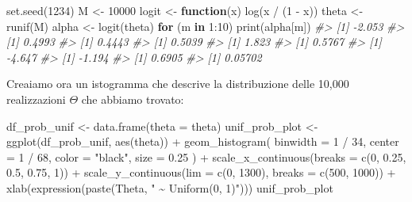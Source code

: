 \documentclass[
  11pt,
]{krantz}
\makeatletter
\newenvironment{Shaded}{\begin{snugshade}}{\end{snugshade}}
\newcommand{\AttributeTok}[1]{\textcolor[rgb]{0.61,0.61,0.61}{#1}}
\newcommand{\CommentTok}[1]{\textcolor[rgb]{0.37,0.37,0.37}{\textit{#1}}}
\newcommand{\ControlFlowTok}[1]{\textcolor[rgb]{0.27,0.27,0.27}{\textbf{#1}}}
\newcommand{\DecValTok}[1]{\textcolor[rgb]{0.06,0.06,0.06}{#1}}
\newcommand{\FloatTok}[1]{\textcolor[rgb]{0.06,0.06,0.06}{#1}}
\newcommand{\FunctionTok}[1]{\textcolor[rgb]{0,0,0}{#1}}
\newcommand{\NormalTok}[1]{#1}
\newcommand{\OtherTok}[1]{\textcolor[rgb]{0.37,0.37,0.37}{#1}}
\newcommand{\SpecialCharTok}[1]{\textcolor[rgb]{0,0,0}{#1}}
\newcommand{\StringTok}[1]{\textcolor[rgb]{0.5,0.5,0.5}{#1}}
\newenvironment{kframe}{%
\medskip{}
\setlength{\fboxsep}{.8em}
 \def\at@end@of@kframe{}%
 \ifinner\ifhmode%
  \def\at@end@of@kframe{\end{minipage}}%
  \begin{minipage}{\columnwidth}%
 \fi\fi%
 \def\FrameCommand##1{\hskip\@totalleftmargin \hskip-\fboxsep
 \colorbox{shadecolor}{##1}\hskip-\fboxsep
     \hskip-\linewidth \hskip-\@totalleftmargin \hskip\columnwidth}%
 \MakeFramed {\advance\hsize-\width
   \@totalleftmargin\z@ \linewidth\hsize
   \@setminipage}}%
 {\par\unskip\endMakeFramed%
 \at@end@of@kframe}
\renewenvironment{Shaded}{\begin{kframe}}{\end{kframe}}
\theoremstyle{definition}
\theoremstyle{definition}
\theoremstyle{definition}
\theoremstyle{definition}
\theoremstyle{remark}
\makeatother
\begin{document}
\begin{Shaded}
\begin{Highlighting}[]
\FunctionTok{set.seed}\NormalTok{(}\DecValTok{1234}\NormalTok{)}
\NormalTok{M }\OtherTok{\textless{}{-}} \DecValTok{10000}
\NormalTok{logit }\OtherTok{\textless{}{-}} \ControlFlowTok{function}\NormalTok{(x) }\FunctionTok{log}\NormalTok{(x }\SpecialCharTok{/}\NormalTok{ (}\DecValTok{1} \SpecialCharTok{{-}}\NormalTok{ x))}
\NormalTok{theta }\OtherTok{\textless{}{-}} \FunctionTok{runif}\NormalTok{(M)}
\NormalTok{alpha }\OtherTok{\textless{}{-}} \FunctionTok{logit}\NormalTok{(theta)}
\ControlFlowTok{for}\NormalTok{ (m }\ControlFlowTok{in} \DecValTok{1}\SpecialCharTok{:}\DecValTok{10}\NormalTok{)}
  \FunctionTok{print}\NormalTok{(alpha[m])}
\CommentTok{\#\textgreater{} [1] {-}2.053}
\CommentTok{\#\textgreater{} [1] 0.4993}
\CommentTok{\#\textgreater{} [1] 0.4443}
\CommentTok{\#\textgreater{} [1] 0.5039}
\CommentTok{\#\textgreater{} [1] 1.823}
\CommentTok{\#\textgreater{} [1] 0.5767}
\CommentTok{\#\textgreater{} [1] {-}4.647}
\CommentTok{\#\textgreater{} [1] {-}1.194}
\CommentTok{\#\textgreater{} [1] 0.6905}
\CommentTok{\#\textgreater{} [1] 0.05702}
\end{Highlighting}
\end{Shaded}

Creaiamo ora un istogramma che descrive la distribuzione delle 10,000 realizzazioni \(\Theta\) che abbiamo trovato:

\begin{Shaded}
\begin{Highlighting}[]
\NormalTok{df\_prob\_unif }\OtherTok{\textless{}{-}} \FunctionTok{data.frame}\NormalTok{(}\AttributeTok{theta =}\NormalTok{ theta)}
\NormalTok{unif\_prob\_plot }\OtherTok{\textless{}{-}}
  \FunctionTok{ggplot}\NormalTok{(df\_prob\_unif, }\FunctionTok{aes}\NormalTok{(theta)) }\SpecialCharTok{+}
  \FunctionTok{geom\_histogram}\NormalTok{(}
    \AttributeTok{binwidth =} \DecValTok{1} \SpecialCharTok{/} \DecValTok{34}\NormalTok{, }\AttributeTok{center =} \DecValTok{1} \SpecialCharTok{/} \DecValTok{68}\NormalTok{, }\AttributeTok{color =} \StringTok{"black"}\NormalTok{,}
    \AttributeTok{size =} \FloatTok{0.25}
\NormalTok{  ) }\SpecialCharTok{+}
  \FunctionTok{scale\_x\_continuous}\NormalTok{(}\AttributeTok{breaks =} \FunctionTok{c}\NormalTok{(}\DecValTok{0}\NormalTok{, }\FloatTok{0.25}\NormalTok{, }\FloatTok{0.5}\NormalTok{, }\FloatTok{0.75}\NormalTok{, }\DecValTok{1}\NormalTok{)) }\SpecialCharTok{+}
  \FunctionTok{scale\_y\_continuous}\NormalTok{(}\AttributeTok{lim =} \FunctionTok{c}\NormalTok{(}\DecValTok{0}\NormalTok{, }\DecValTok{1300}\NormalTok{), }\AttributeTok{breaks =} \FunctionTok{c}\NormalTok{(}\DecValTok{500}\NormalTok{, }\DecValTok{1000}\NormalTok{)) }\SpecialCharTok{+}
  \FunctionTok{xlab}\NormalTok{(}\FunctionTok{expression}\NormalTok{(}\FunctionTok{paste}\NormalTok{(Theta, }\StringTok{" \textasciitilde{} Uniform(0, 1)"}\NormalTok{)))}
\NormalTok{unif\_prob\_plot}
\end{Highlighting}
\end{Shaded}
\end{document}
